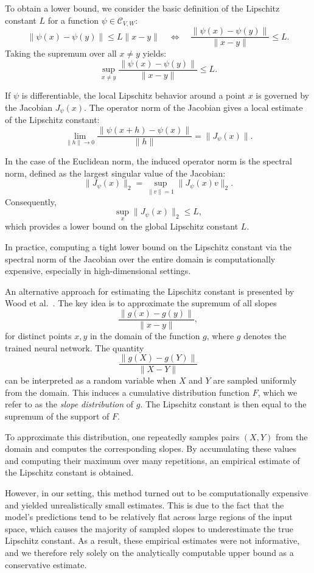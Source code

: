 To obtain a lower bound, we consider the basic definition of the Lipschitz constant \( L \) for a function \( \psi \in \mathcal{C}_{V,W} \):
\[
\|\psi(x) - \psi(y)\| \leq L \|x - y\| \quad \Longleftrightarrow \quad \frac{\|\psi(x) - \psi(y)\|}{\|x - y\|} \leq L.
\]
Taking the supremum over all \( x \neq y \) yields:
\[
\sup_{x \neq y} \frac{\|\psi(x) - \psi(y)\|}{\|x - y\|} \leq L.
\]

If \( \psi \) is differentiable, the local Lipschitz behavior around a point \( x \) is governed by the Jacobian \( J_\psi(x) \). The operator norm of the Jacobian gives a local estimate of the Lipschitz constant:
\[
\lim_{\|h\| \to 0} \frac{\|\psi(x + h) - \psi(x)\|}{\|h\|} = \|J_\psi(x)\|.
\]

In the case of the Euclidean norm, the induced operator norm is the spectral norm, defined as the largest singular value of the Jacobian:
\[
\|J_\psi(x)\|_2 = \sup_{\|v\| = 1} \|J_\psi(x)v\|_2.
\]
Consequently,
\[
\sup_x \|J_\psi(x)\|_2 \leq L,
\]
which provides a lower bound on the global Lipschitz constant \( L \).

In practice, computing a tight lower bound on the Lipschitz constant via the spectral norm of the Jacobian over the entire domain is computationally expensive, especially in high-dimensional settings.

An alternative approach for estimating the Lipschitz constant is presented by Wood et al.~\cite{lipschitz_estimation}.
The key idea is to approximate the supremum of all slopes
\[
\frac{\|g(x)-g(y)\|}{\|x - y\|},
\]
for distinct points \( x, y \) in the domain of the function \( g \), where \( g \) denotes the trained neural network. 
The quantity
\[
\frac{\|g(X) - g(Y)\|}{\|X - Y\|}
\]
can be interpreted as a random variable when \( X \) and \( Y \) are sampled uniformly from the domain. 
This induces a cumulative distribution function \( F \), which we refer to as the \emph{slope distribution} of \( g \).
The Lipschitz constant is then equal to the supremum of the support of \( F \).

To approximate this distribution, one repeatedly samples pairs \( (X, Y) \) from the domain and computes the corresponding slopes.
By accumulating these values and computing their maximum over many repetitions, an empirical estimate of the Lipschitz constant is obtained.

However, in our setting, this method turned out to be computationally expensive and yielded unrealistically small estimates.
This is due to the fact that the model's predictions tend to be relatively flat across large regions of the input space, which causes the majority of sampled slopes to underestimate the true Lipschitz constant. 
As a result, these empirical estimates were not informative, and we therefore rely solely on the analytically computable upper bound as a conservative estimate.



